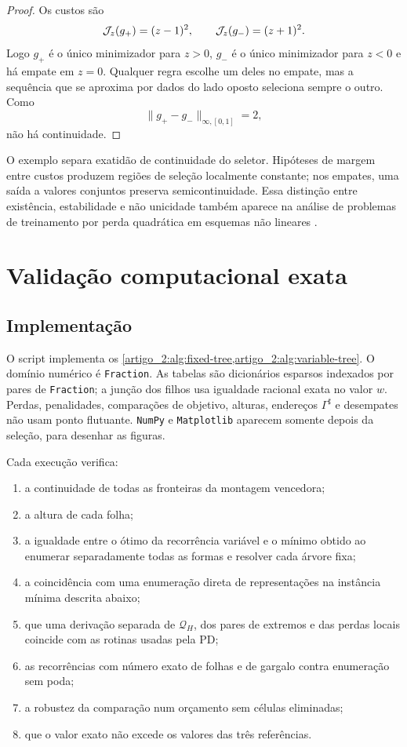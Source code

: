 \begin{proof}
Os custos são
\[
 \mathcal{J}_z(g_+)=(z-1)^2,\qquad
 \mathcal{J}_z(g_-)=(z+1)^2.
\]
Logo $g_+$ é o único minimizador para $z>0$, $g_-$ é o único minimizador para
$z<0$ e há empate em $z=0$. Qualquer regra escolhe um deles no empate, mas a
sequência que se aproxima por dados do lado oposto seleciona sempre o outro.
Como
\[
 \|g_+-g_-\|_{\infty,[0,1]}=2,
\]
não há continuidade.
\end{proof}

O exemplo separa exatidão de continuidade do seletor. Hipóteses de margem
entre custos produzem regiões de seleção localmente constante; nos empates,
uma saída a valores conjuntos preserva semicontinuidade. Essa distinção entre
existência, estabilidade e não unicidade também aparece na análise de problemas
de treinamento por perda quadrática em esquemas não lineares
\citep{artigo_1-christof2021}.

\section{Validação computacional exata}
\label{artigo_2:sec:numerical}

\subsection{Implementação}

O script
implementa os \cref{artigo_2:alg:fixed-tree,artigo_2:alg:variable-tree}. O domínio numérico é
\texttt{Fraction}. As tabelas são dicionários esparsos indexados
por pares de \texttt{Fraction}; a junção dos filhos usa igualdade racional
exata no valor $w$. Perdas, penalidades, comparações de objetivo, alturas,
endereços $\Gamma^\sharp$ e desempates não usam ponto flutuante.
\texttt{NumPy} e \texttt{Matplotlib} aparecem somente depois da seleção, para
desenhar as figuras.

Cada execução verifica:
\begin{enumerate}[label=(\alph*),leftmargin=2em]
 \item a continuidade de todas as fronteiras da montagem vencedora;
 \item a altura de cada folha;
 \item a igualdade entre o ótimo da recorrência variável e o mínimo obtido ao
 enumerar separadamente todas as formas e resolver cada árvore fixa;
 \item a coincidência com uma enumeração direta de representações na
 instância mínima descrita abaixo;
 \item que uma derivação separada de $\mathcal Q_H$, dos pares de extremos
 e das perdas locais coincide com as rotinas usadas pela PD;
 \item as recorrências com número exato de folhas e de gargalo contra
 enumeração sem poda;
 \item a robustez da comparação num orçamento sem células eliminadas;
 \item que o valor exato não excede os valores das três referências.
\end{enumerate}


